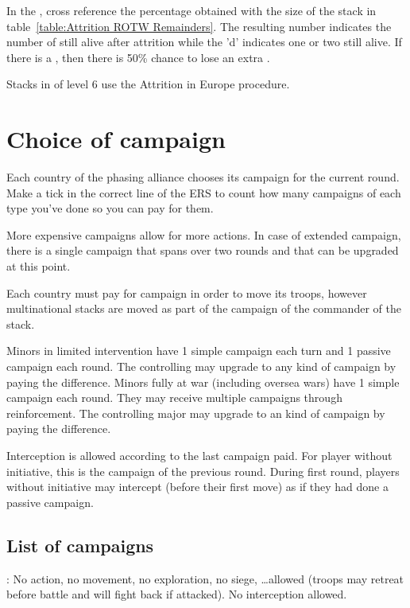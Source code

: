 \smallskip

In the \ROTW, cross reference the percentage obtained with the size of the
stack in table~\ref{table:Attrition ROTW Remainders}. The resulting number
indicates the number of \LD still alive after attrition while the 'd'
indicates one or two \LDE still alive. If there is a \textetoile, then there
is 50\% chance to lose an extra \LDE.

Stacks in \COL of level 6 use the Attrition in Europe procedure.


\section{Choice of campaign}
Each country of the phasing alliance chooses its campaign for the current
round. Make a tick in the correct line of the ERS to count how many campaigns
of each type you've done so you can pay for them.

More expensive campaigns allow for more actions. In case of extended campaign,
there is a single campaign that spans over two rounds and that can be upgraded
at this point.

Each country must pay for campaign in order to move its troops, however
multinational stacks are moved as part of the campaign of the commander of the
stack.

\bparag Minors in limited intervention have 1 simple campaign each turn and 1
passive campaign each round. The controlling \MAJ may upgrade to any kind of
campaign by paying the difference.
\bparag Minors fully at war (including oversea wars) have 1 simple campaign
each round. They may receive multiple campaigns through reinforcement. The
controlling major may upgrade to an kind of campaign by paying the
difference.

 Interception is allowed according to the
last campaign paid.
\bparag For player without initiative, this is the campaign of the previous
round.
\bparag During first round, players without initiative may intercept (before
their first move) as if they had done a passive campaign.

\subsection{List of campaigns}
\ducats: No action, no movement, no exploration, no siege,
\ldots allowed (troops may retreat before battle and will fight back if
attacked). No interception allowed.

